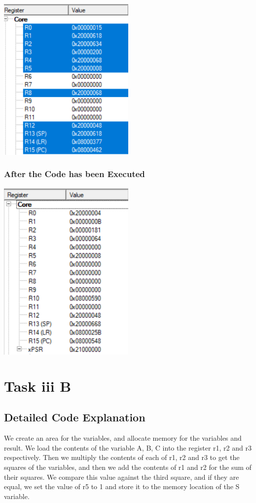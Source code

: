 \documentclass{article}
\begin{document}
\begin{center}
    \includegraphics[width=0.5\textwidth]{task_iii_A_before.png}
\end{center}

\subsubsection{After the Code has been Executed}

\begin{center}
    \includegraphics[width=0.5\textwidth]{task_iii_A_after.png}
\end{center}

\section{Task iii B}

\subsection{Detailed Code Explanation}
We create an area for the variables, and allocate memory for the variables and result. We load the contents of the variable A, B, C into the register r1, r2 and r3 respectively. Then we multiply the contents of each of r1, r2 and r3 to get the squares of the variables, and then we add the contents of r1 and r2 for the sum of their squares. We compare this value against the third square, and if they are equal, we set the value of r5 to 1 and store it to the memory location of the S variable.
\end{document}
